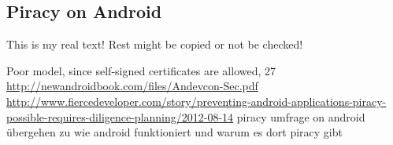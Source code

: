 \subsection{Piracy on Android }\label{subsection:foundation-piracy-android}
This is my real text! Rest might be copied or not be checked!


Poor model, since self-signed certificates are allowed, 27 \url{http://newandroidbook.com/files/Andevcon-Sec.pdf}\newline
\url{http://www.fiercedeveloper.com/story/preventing-android-applications-piracy-possible-requires-diligence-planning/2012-08-14} piracy umfrage on android\newline
übergehen zu wie android funktioniert und warum es dort piracy gibt\newline
